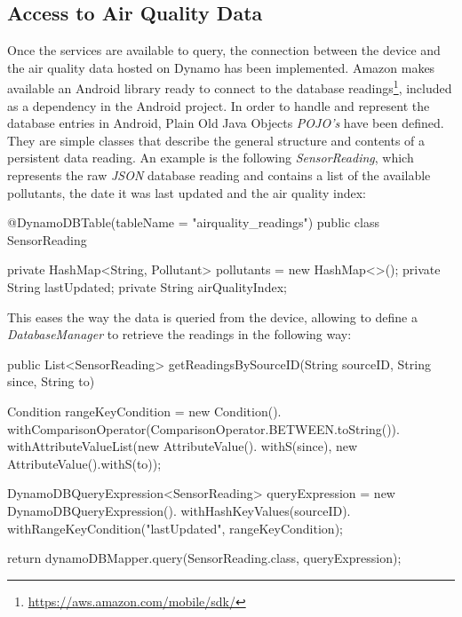 \subsection{Access to Air Quality Data}
Once the services are available to query, the connection between the device and the air quality data hosted on Dynamo has been implemented. Amazon makes available an Android library ready to connect to the database readings\footnote{\url{https://aws.amazon.com/mobile/sdk/}}, included as a dependency in the Android project. In order to handle and represent the database entries in Android, Plain Old Java Objects \textit{POJO's} have been defined. They are simple classes that describe the general structure and contents of a persistent data reading. An example is the following \textit{SensorReading}, which represents the raw \textit{JSON} database reading  and contains a list of the available pollutants, the date it was last updated and the air quality index:

{\centering
\begin{spverbatim}

@DynamoDBTable(tableName = "airquality_readings")
public class SensorReading {

    private HashMap<String, Pollutant> pollutants = new HashMap<>();
    private String lastUpdated;
    private String airQualityIndex;
}
\end{spverbatim}
\par
}

This eases the way the data is queried from the device, allowing to define a \textit{DatabaseManager} to retrieve the readings in the following way: 

{\centering
\begin{spverbatim}
public List<SensorReading> getReadingsBySourceID(String sourceID, String since, String to) {

  Condition rangeKeyCondition = new Condition().
    withComparisonOperator(ComparisonOperator.BETWEEN.toString()).
    withAttributeValueList(new AttributeValue().
    withS(since), new AttributeValue().withS(to));

  DynamoDBQueryExpression<SensorReading> queryExpression = new
    DynamoDBQueryExpression().
    withHashKeyValues(sourceID).
    withRangeKeyCondition("lastUpdated", rangeKeyCondition);
  
return dynamoDBMapper.query(SensorReading.class, queryExpression);
}
\end{spverbatim}
\par
}

